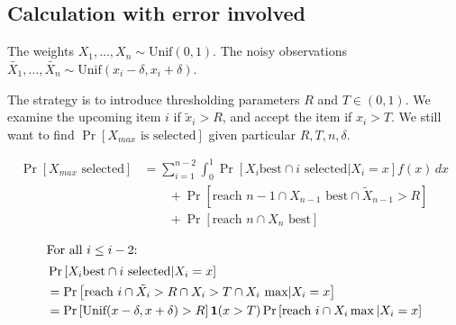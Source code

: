 \subsection{Calculation with error involved}

The weights $X_1, \ldots, X_n \sim \text{Unif}(0,1).$
The noisy observations $\tilde{X_1},\ldots,\tilde{X_n} \sim \text{Unif}(x_i-\delta, x_{i}+\delta).$

The strategy is to introduce thresholding parameters $R$ and $T \in (0,1).$ We examine the upcoming item $i$ if $\tilde{x}_{i}>R$, and accept the item if $x_{i}>T$.
We still want to find $\operatorname{Pr}\left[{X_{max} \text{ is selected}}\right]$ given particular $R,T,n,\delta$.

\begin{equation}
	\begin{split}
	    \operatorname{Pr}\left[{X_{max} \text{ selected}}\right]&=\sum_{i=1}^{n-2} \int_0^1 \operatorname{Pr}\left[{X_i \text{best} \cap i \text{ selected} | X_{i} = x}\right] f(x) \, dx \\
	    &\qquad + \operatorname{Pr}\left[{\text{reach }n-1 \cap X_{n-1} \text{ best} \cap \tilde X_{n-1} > R}\right] \\
	    &\qquad + \operatorname{Pr}\left[{\text{reach }n \cap X_n \text{ best}}\right]
	\end{split}
\end{equation}

\begin{align*}
    \intertext{For all $i\le i-2$:}
	&\operatorname{Pr}\left[{X_i \text{best} \cap i \text{ selected} | X_{i} = x}\right] \\
	&= \operatorname{Pr}\left[{\text{reach }i \cap \tilde{X_{i}}>R \cap X_{i}>T \cap X_i \text{ max} | X_i= x}\right] \\
	&= \operatorname{Pr}\left[{\text{Unif}(x-\delta, x+\delta)>R}\right]\textbf{1}{\left( x>T \right) }\operatorname{Pr}\left[{\text{reach }i \cap X_i \max | X_i = x}\right]
\end{align*}
	
